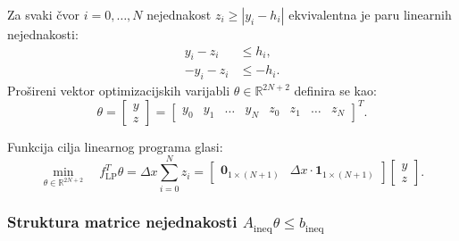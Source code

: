 Za svaki čvor $i = 0, \dots, N$ nejednakost $z_i \geq |y_i - h_i|$ ekvivalentna je paru linearnih nejednakosti:
\begin{align}
y_i - z_i &\leq h_i, \label{eq:lp_slack1} \\
-y_i - z_i &\leq -h_i. \label{eq:lp_slack2}
\end{align}
Prošireni vektor optimizacijskih varijabli $\theta \in \mathbb{R}^{2N+2}$ definira se kao:
\begin{equation}
\theta = \begin{bmatrix} y \\ z \end{bmatrix} = \begin{bmatrix} y_0 & y_1 & \dots & y_N & z_0 & z_1 & \dots & z_N \end{bmatrix}^T.
\end{equation}

Funkcija cilja linearnog programa glasi:
\begin{equation}
\min_{\theta \in \mathbb{R}^{2N+2}} \quad f_{\mathrm{LP}}^T \theta = \Delta x \sum_{i=0}^N z_i = \begin{bmatrix} \mathbf{0}_{1 \times (N+1)} & \Delta x \cdot \mathbf{1}_{1 \times (N+1)} \end{bmatrix} \begin{bmatrix} y \\ z \end{bmatrix}.
\end{equation}

\subsubsection{Struktura matrice nejednakosti $A_{\mathrm{ineq}} \theta \leq b_{\mathrm{ineq}}$}

